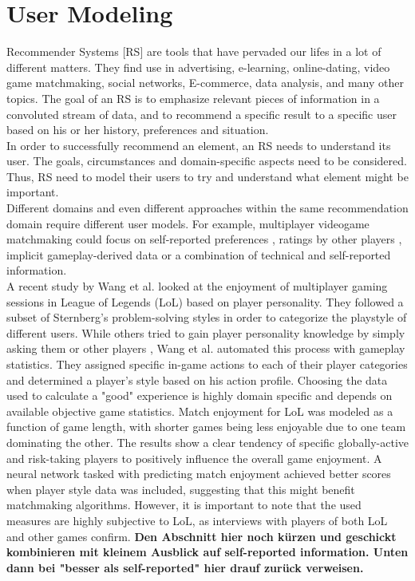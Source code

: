 \documentclass[nochapterpage,bigchapter,linedtoc,longdoc,colorback,accentcolor=tud3b]{tudreport}
\begin{document}
\section{User Modeling}
Recommender Systems [RS] are tools that have pervaded our lifes in a lot of different matters. They find use in advertising, e-learning, online-dating, video game matchmaking, social networks, E-commerce, data analysis, and many other topics. The goal of an RS is to emphasize relevant pieces of information in a convoluted stream of data, and to recommend a specific result to a specific user based on his or her history, preferences and situation. \cite{ricci2011introduction}\\
In order to successfully recommend an element, an RS needs to understand its user. The goals, circumstances and domain-specific aspects need to be considered. Thus, RS need to model their users to try and understand what element might be important.\\
Different domains and even different approaches within the same recommendation domain require different user models. For example, multiplayer videogame matchmaking could focus on self-reported preferences \cite{riegelsberger2007personality}, ratings by other players \cite{patrick2011system}, implicit gameplay-derived data \cite{suznjevic2015application, delalleau2012beyond} or a combination of technical and self-reported information. \cite{farnham2009method}\\
A recent study by Wang et al. \cite{wang2015thinking} looked at the enjoyment of multiplayer gaming sessions in League of Legends (LoL) based on player personality. They followed a subset of Sternberg's \cite{sternberg1999thinking} problem-solving styles in order to categorize the playstyle of different users. While others tried to gain player personality knowledge by simply asking them \cite{riegelsberger2007personality} or other players \cite{patrick2011system}, Wang et al. automated this process with gameplay statistics. They assigned specific in-game actions to each of their player categories and determined a player's style based on his action profile. Choosing the data used to calculate a "good" experience is highly domain specific and depends on available objective game statistics.\cite{delalleau2012beyond} Match enjoyment for LoL was modeled as a function of game length, with shorter games being less enjoyable due to one team dominating the other. The results show a clear tendency of specific globally-active and risk-taking players to positively influence the overall game enjoyment. A neural network tasked with predicting match enjoyment achieved better scores when player style data was included, suggesting that this might benefit matchmaking algorithms. However, it is important to note that the used measures are highly subjective to LoL, as interviews with players of both LoL and other games confirm. \textbf{Den Abschnitt hier noch kürzen und geschickt kombinieren mit kleinem Ausblick auf self-reported information. Unten dann bei "besser als self-reported" hier drauf zurück verweisen.}\\
\end{document}
